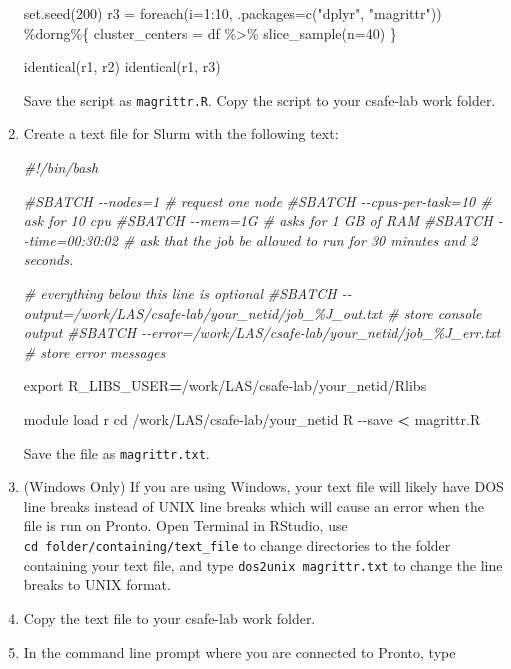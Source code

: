 \documentclass[
]{book}
\newenvironment{Shaded}{\begin{snugshade}}{\end{snugshade}}
\newcommand{\AttributeTok}[1]{\textcolor[rgb]{0.77,0.63,0.00}{#1}}
\newcommand{\BuiltInTok}[1]{#1}
\newcommand{\CommentTok}[1]{\textcolor[rgb]{0.56,0.35,0.01}{\textit{#1}}}
\newcommand{\DecValTok}[1]{\textcolor[rgb]{0.00,0.00,0.81}{#1}}
\newcommand{\ExtensionTok}[1]{#1}
\newcommand{\FunctionTok}[1]{\textcolor[rgb]{0.00,0.00,0.00}{#1}}
\newcommand{\NormalTok}[1]{#1}
\newcommand{\OperatorTok}[1]{\textcolor[rgb]{0.81,0.36,0.00}{\textbf{#1}}}
\newcommand{\OtherTok}[1]{\textcolor[rgb]{0.56,0.35,0.01}{#1}}
\newcommand{\SpecialCharTok}[1]{\textcolor[rgb]{0.00,0.00,0.00}{#1}}
\newcommand{\StringTok}[1]{\textcolor[rgb]{0.31,0.60,0.02}{#1}}
\newcommand{\VariableTok}[1]{\textcolor[rgb]{0.00,0.00,0.00}{#1}}
\begin{document}
\begin{enumerate}
\begin{Shaded}
\begin{Highlighting}[]
\FunctionTok{set.seed}\NormalTok{(}\DecValTok{200}\NormalTok{)}
\NormalTok{r3 }\OtherTok{=} \FunctionTok{foreach}\NormalTok{(}\AttributeTok{i=}\DecValTok{1}\SpecialCharTok{:}\DecValTok{10}\NormalTok{, }\AttributeTok{.packages=}\FunctionTok{c}\NormalTok{(}\StringTok{"dplyr"}\NormalTok{, }\StringTok{"magrittr"}\NormalTok{)) }\SpecialCharTok{\%dorng\%}\NormalTok{\{ }
\NormalTok{  cluster\_centers }\OtherTok{=}\NormalTok{ df }\SpecialCharTok{\%\textgreater{}\%} \FunctionTok{slice\_sample}\NormalTok{(}\AttributeTok{n=}\DecValTok{40}\NormalTok{)}
\NormalTok{\}}

\FunctionTok{identical}\NormalTok{(r1, r2)}
\FunctionTok{identical}\NormalTok{(r1, r3)}
\end{Highlighting}
\end{Shaded}

  Save the script as \texttt{magrittr.R}. Copy the script to your csafe-lab work folder.
\item
  Create a text file for Slurm with the following text:

\begin{Shaded}
\begin{Highlighting}[]
\CommentTok{\#!/bin/bash}

\CommentTok{\#SBATCH {-}{-}nodes=1 \# request one node}
\CommentTok{\#SBATCH {-}{-}cpus{-}per{-}task=10  \# ask for 10 cpu}
\CommentTok{\#SBATCH {-}{-}mem=1G \#  asks for 1 GB of RAM}
\CommentTok{\#SBATCH {-}{-}time=00:30:02 \# ask that the job be allowed to run for 30 minutes and 2 seconds.}

\CommentTok{\# everything below this line is optional}
\CommentTok{\#SBATCH {-}{-}output=/work/LAS/csafe{-}lab/your\_netid/job\_\%J\_out.txt \# store console output}
\CommentTok{\#SBATCH {-}{-}error=/work/LAS/csafe{-}lab/your\_netid/job\_\%J\_err.txt \# store error messages}

\BuiltInTok{export} \VariableTok{R\_LIBS\_USER}\OperatorTok{=}\NormalTok{/work/LAS/csafe{-}lab/your\_netid/Rlibs}

\ExtensionTok{module}\NormalTok{ load r}
\BuiltInTok{cd}\NormalTok{ /work/LAS/csafe{-}lab/your\_netid}
\ExtensionTok{R} \AttributeTok{{-}{-}save} \OperatorTok{\textless{}}\NormalTok{ magrittr.R}
\end{Highlighting}
\end{Shaded}

  Save the file as \texttt{magrittr.txt}.
\item
  (Windows Only) If you are using Windows, your text file will likely have DOS line breaks instead of UNIX line breaks which will cause an error when the file is run on Pronto. Open Terminal in RStudio, use \texttt{cd\ folder/containing/text\_file} to change directories to the folder containing your text file, and type \texttt{dos2unix\ magrittr.txt} to change the line breaks to UNIX format.
\item
  Copy the text file to your csafe-lab work folder.
\item
  In the command line prompt where you are connected to Pronto, type


\end{enumerate}
\end{document}
